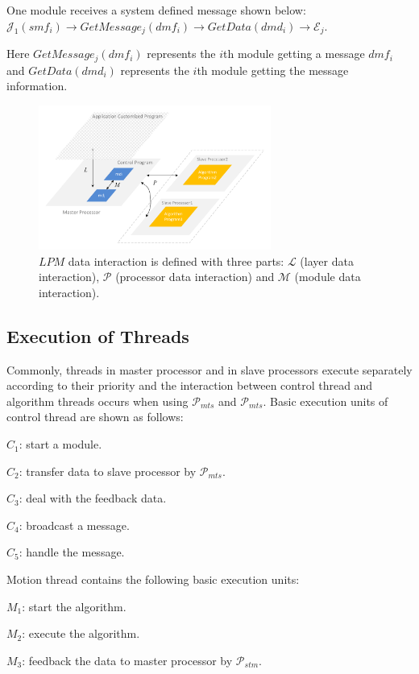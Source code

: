 \documentclass[journal,UTF8]{IEEEtran}
\begin{document}
One module receives a system defined message shown below:
$\mathcal{J}_1(smf_i)\to GetMessage_{j}(dmf_i)\to GetData(dmd_i)\to\mathcal{E}_j$.

 Here $GetMessage_{j}(dmf_i)$ represents the $i$th module getting a message $dmf_i$ and $GetData(dmd_i)$ represents the $i$th module getting the message information.

 \begin{figure}
	\centering
	\includegraphics[width=3in]{fig/Interaction.pdf}
	\caption{ $LPM$ data interaction is defined with three parts: $\mathcal{L}$ (layer data interaction), $\mathcal{P}$ (processor data interaction) and $\mathcal{M}$ (module data interaction).}
	\label{fig:Interaction}
\end{figure}

 \subsection{Execution of Threads}
 Commonly, threads in master processor and in slave processors execute separately according to their priority and the interaction between control thread and algorithm threads occurs when using $\mathcal{P}_{mts}$ and $\mathcal{P}_{mts}$. Basic execution units of control thread are shown as follows:
 
 \textbf{$C_{1}$}: start a module.
 
 \textbf{$C_{2}$}: transfer data to slave processor by $\mathcal{P}_{mts}$.
 
 \textbf{$C_{3}$}: deal with the feedback data.
 
 \textbf{$C_{4}$}: broadcast a message.
 
  \textbf{$C_{5}$}: handle the message.
  
 Motion thread contains the following basic execution units:
 
 \textbf{$M_{1}$}: start the algorithm.
 
 \textbf{$M_{2}$}: execute the algorithm.
 
 \textbf{$M_{3}$}: feedback the data to master processor by $\mathcal{P}_{stm}$.
 
\end{document}
